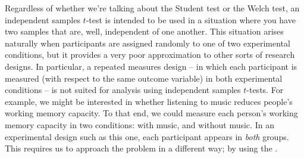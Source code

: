 Regardless of whether we're talking about the Student test or the Welch test, an independent samples $t$-test is intended to be used in a situation where you have two samples that are, well, independent of one another. This situation arises naturally when participants are assigned randomly to one of two experimental conditions, but it provides a very poor approximation to other sorts of research designs. In particular, a repeated measures design -- in which each participant is measured (with respect to the same outcome variable) in both experimental conditions -- is not suited for analysis using independent samples $t$-tests. For example, we might be interested in whether listening to music reduces people's working memory capacity. To that end, we could measure each person's working memory capacity in two conditions: with music, and without music. In an experimental design such as this one, each participant appears in {\it both} groups. This requires us to approach the problem in a different way; by using the . 


